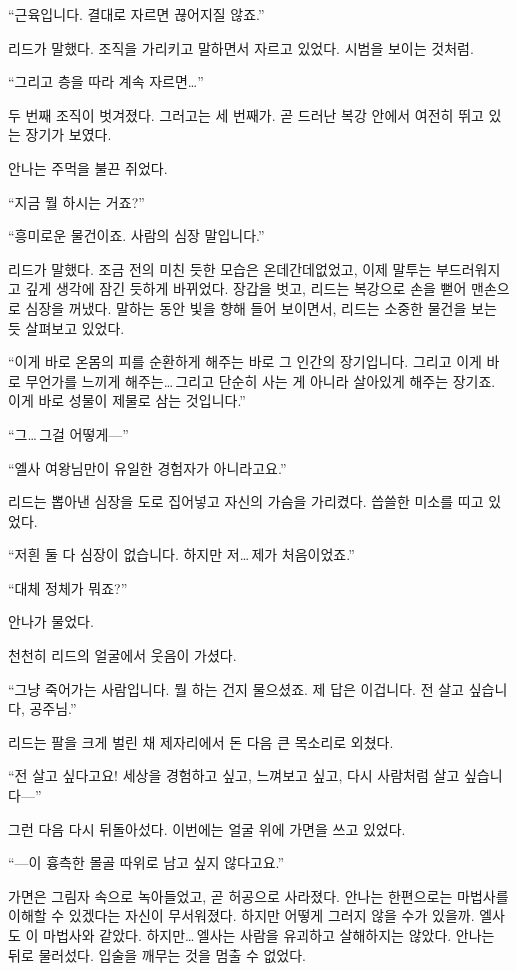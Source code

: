 ``근육입니다. 결대로 자르면 끊어지질 않죠.''

리드가 말했다. 조직을 가리키고 말하면서 자르고 있었다. 시범을 보이는 것처럼.

``그리고 층을 따라 계속 자르면\ldots''

두 번째 조직이 벗겨졌다. 그러고는 세 번째가. 곧 드러난 복강 안에서 여전히 뛰고 있는 장기가 보였다.

안나는 주먹을 불끈 쥐었다.

``지금 뭘 하시는 거죠?''

`` 흥미로운 물건이죠. 사람의 심장 말입니다.''

리드가 말했다. 조금 전의 미친 듯한 모습은 온데간데없었고, 이제 말투는 부드러워지고 깊게 생각에 잠긴 듯하게 바뀌었다. 장갑을 벗고, 리드는 복강으로 손을 뻗어 맨손으로 심장을 꺼냈다. 말하는 동안 빛을 향해 들어 보이면서, 리드는 소중한 물건을 보는 듯 살펴보고 있었다.

``이게 바로 온몸의 피를 순환하게 해주는 바로 그 인간의 장기입니다. 그리고 이게 바로 무언가를 느끼게 해주는\ldots\,그리고 단순히 사는 게 아니라 살아있게 해주는 장기죠. 이게 바로 성물이 제물로 삼는 것입니다.''

``그\ldots\,그걸 어떻게—''

``엘사 여왕님만이 유일한 경험자가 아니라고요.''

리드는 뽑아낸 심장을 도로 집어넣고 자신의 가슴을 가리켰다. 씁쓸한 미소를 띠고 있었다.

``저흰 둘 다 심장이 없습니다. 하지만 저\ldots\,제가 처음이었죠.''

``대체 정체가 뭐죠?''

안나가 물었다.

천천히 리드의 얼굴에서 웃음이 가셨다.

``그냥 죽어가는 사람입니다. 뭘 하는 건지 물으셨죠. 제 답은 이겁니다. 전 살고 싶습니다, 공주님.''

리드는 팔을 크게 벌린 채 제자리에서 돈 다음 큰 목소리로 외쳤다.

``전 살고 싶다고요! 세상을 경험하고 싶고, 느껴보고 싶고, 다시 사람처럼 살고 싶습니다—''

그런 다음 다시 뒤돌아섰다. 이번에는 얼굴 위에 가면을 쓰고 있었다.

``—이 흉측한 몰골 따위로 남고 싶지 않다고요.''

가면은 그림자 속으로 녹아들었고, 곧 허공으로 사라졌다. 안나는 한편으로는 마법사를 이해할 수 있겠다는 자신이 무서워졌다. 하지만 어떻게 그러지 않을 수가 있을까. 엘사도 이 마법사와 같았다. 하지만\ldots\,엘사는 사람을 유괴하고 살해하지는 않았다. 안나는 뒤로 물러섰다. 입술을 깨무는 것을 멈출 수 없었다.

